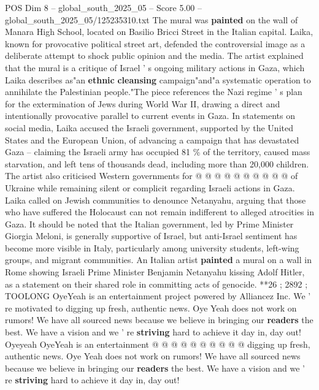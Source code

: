 \begin{textsample}{POS Dim 8 – global\_south\_2025\_05 – Score 5.00 – global\_south\_2025\_05/125235310.txt}  \label{ex:f8_pos_137}
The mural was \textbf{painted} on the wall of Manara High School, located on Basilio Bricci Street in the Italian capital.
Laika, known for provocative political street art, defended the controversial image as a deliberate attempt to shock public opinion and the media.
The artist explained that the mural is a critique of Israel ' s ongoing military actions in Gaza, which Laika describes as"an \textbf{ethnic} \textbf{cleansing} campaign"and"a systematic operation to annihilate the Palestinian people."The piece references the Nazi regime ' s plan for the extermination of Jews during World War II, drawing a direct and intentionally provocative parallel to current events in Gaza.
In statements on social media, Laika accused the Israeli government, supported by the United States and the European Union, of advancing a campaign that has devastated Gaza -- claiming the Israeli army has occupied 81 \% of the territory, caused mass starvation, and left tens of thousands dead, including more than 20,000 children.
The artist also criticised Western governments for @ @ @ @ @ @ @ @ @ @ of Ukraine while remaining silent or complicit regarding Israeli actions in Gaza.
Laika called on Jewish communities to denounce Netanyahu, arguing that those who have suffered the Holocaust can not remain indifferent to alleged atrocities in Gaza.
It should be noted that the Italian government, led by Prime Minister Giorgia Meloni, is generally supportive of Israel, but anti-Israel sentiment has become more visible in Italy, particularly among university students, left-wing groups, and migrant communities.
An Italian artist \textbf{painted} a mural on a wall in Rome showing Israeli Prime Minister Benjamin Netanyahu kissing Adolf Hitler, as a statement on their shared role in committing acts of genocide. **26 ; 2892 ; TOOLONG OyeYeah is an entertainment project powered by Alliancez Inc.
We ' re motivated to digging up fresh, authentic news.
Oye Yeah does not work on rumors!
We have all sourced news because we believe in bringing our \textbf{readers} the best.
We have a vision and we ' re \textbf{striving} hard to achieve it day in, day out!
Oyeyeah OyeYeah is an entertainment @ @ @ @ @ @ @ @ @ @ digging up fresh, authentic news.
Oye Yeah does not work on rumors!
We have all sourced news because we believe in bringing our \textbf{readers} the best.
We have a vision and we ' re \textbf{striving} hard to achieve it day in, day out!

\end{textsample}

